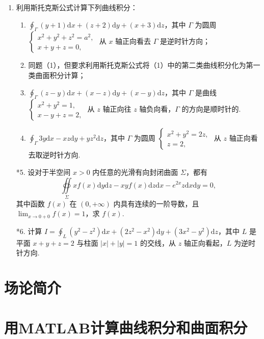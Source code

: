 \begin{enumerate}
    \item 利用斯托克斯公式计算下列曲线积分：
    \begin{enumerate}[(1)]\setlength{\itemsep}{5pt}\setlength{\topsep}{15pt}
        \item $\displaystyle\oint_{\Gamma}(y+1)\text{d}x+(z+2)\text{d}y+(x+3)\text{d}z$，其中 $\Gamma$ 为圆周 $\begin{cases}
            x^2+y^2+z^2=a^2,\\
            x+y+z=0,
        \end{cases}$ 从 $x$ 轴正向看去 $\Gamma$ 是逆时针方向；
        \item 同题（1），但要求利用斯托克斯公式将（1）中的第二类曲线积分化为第一类曲面积分计算；
        \item $\displaystyle\oint_{\Gamma}(z-y)\text{d}x+(x-z)\text{d}y+(x-y)\text{d}z$，其中 $\Gamma$ 是曲线$\begin{cases}
            x^2+y^2=1,\\
            x-y+z=2,
        \end{cases}$ 从 $z$ 轴正向往 $z$ 轴负向看，$\Gamma$ 的方向是顺时针的.
        \item $\displaystyle\oint_{\Gamma}3y\text{d}x-xz\text{d}y+yz^2\text{d}z$，其中 $\Gamma$ 为圆周 $\begin{cases}
            x^2+y^2=2z,\\
            z=2,
        \end{cases}$ 从 $z$ 轴正向看去取逆时针方向.
    \end{enumerate}

    \item[*5.] 设对于半空间 $x>0$ 内任意的光滑有向封闭曲面 $\Sigma$，都有
    \[
        \oiint\limits_{\Sigma}xf(x)\text{d}y\text{d}z-xyf(x)\text{d}z\text{d}x-e^{2x}z\text{d}x\text{d}y=0,
    \]
    其中函数 $f(x)$ 在 $(0, +\infty)$ 内具有连续的一阶导数，且 $\displaystyle\lim_{x\to0+0}f(x)=1$，求 $f(x)$.
    
    \item[*6.] 计算 $I=\displaystyle\oint_{L}(y^2-z^2)\text{d}x+(2z^2-x^2)\text{d}y+(3x^2-y^2)\text{d}z$，其中 $L$ 是平面 $x+y+z=2$ 与柱面 $|x|+|y|=1$ 的交线，从 $z$ 轴正向看起，$L$ 为逆时针方向.
\end{enumerate}

\section{场论简介}


\section{用MATLAB计算曲线积分和曲面积分}
